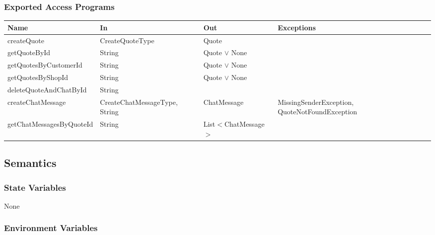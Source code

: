 \documentclass[12pt, titlepage]{article}
\begin{document}
\subsubsection{Exported Access Programs}

\begin{center}
	\begin{adjustbox}{width=\textwidth}
		\begin{tabular}{llll}
			\hline
			\textbf{Name}            & \textbf{In}                   & \textbf{Out}          & \textbf{Exceptions}                            \\
			\hline
			createQuote              & CreateQuoteType               & Quote                 & ~                                              \\
			getQuoteById             & String                        & Quote $\lor$ None     & ~                                              \\
			getQuotesByCustomerId    & String                        & Quote $\lor$ None     & ~                                              \\
			getQuotesByShopId        & String                        & Quote $\lor$ None     & ~                                              \\
			deleteQuoteAndChatById   & String                        & ~                     & ~                                              \\
			createChatMessage        & CreateChatMessageType, String & ChatMessage           & MissingSenderException, QuoteNotFoundException \\
			getChatMessagesByQuoteId & String                        & List$<$ChatMessage$>$ & ~                                              \\
			\hline
		\end{tabular}
	\end{adjustbox}
\end{center}

\subsection{Semantics}

\subsubsection{State Variables}

None

\subsubsection{Environment Variables}
\end{document}
